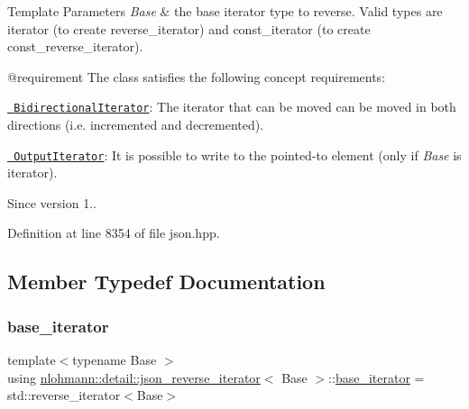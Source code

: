 \begin{DoxyTemplParams}{Template Parameters}
{\em Base} & the base iterator type to reverse. Valid types are iterator (to create reverse\+\_\+iterator) and const\+\_\+iterator (to create const\+\_\+reverse\+\_\+iterator).\\
\hline
\end{DoxyTemplParams}
@requirement The class satisfies the following concept requirements\+:
\begin{DoxyItemize}
\item \href{https://en.cppreference.com/w/cpp/named_req/BidirectionalIterator}{\texttt{ Bidirectional\+Iterator}}\+: The iterator that can be moved can be moved in both directions (i.\+e. incremented and decremented).
\item \href{https://en.cppreference.com/w/cpp/named_req/OutputIterator}{\texttt{ Output\+Iterator}}\+: It is possible to write to the pointed-\/to element (only if {\itshape Base} is iterator).
\end{DoxyItemize}

\begin{DoxySince}{Since}
version 1.. 
\end{DoxySince}


Definition at line 8354 of file json.\+hpp.



\subsection{Member Typedef Documentation}
\mbox{\label{classnlohmann_1_1detail_1_1json__reverse__iterator_a6b2ef1d632fe49bfcc22fbd1abd62395}} 
\subsubsection{\texorpdfstring{base\_iterator}{base\_iterator}}
{\footnotesize\ttfamily template$<$typename Base $>$ \\
using \mbox{\hyperlink{classnlohmann_1_1detail_1_1json__reverse__iterator}{nlohmann\+::detail\+::json\+\_\+reverse\+\_\+iterator}}$<$ Base $>$\+::\mbox{\hyperlink{classnlohmann_1_1detail_1_1json__reverse__iterator_a6b2ef1d632fe49bfcc22fbd1abd62395}{base\+\_\+iterator}} =  std\+::reverse\+\_\+iterator$<$Base$>$}



